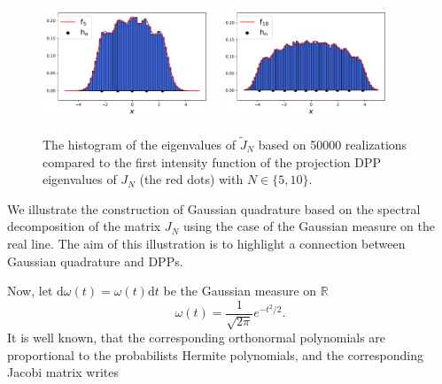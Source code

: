 \documentclass[twoside,11pt]{book}
\numberwithin{theorem}{chapter}
\numberwithin{definition}{chapter}
\numberwithin{proposition}{chapter}
\numberwithin{corollary}{chapter}
\numberwithin{example}{chapter}
\numberwithin{lemma}{chapter}
\numberwithin{assumption}{chapter}
\begin{document}
\begin{figure}[]
    \centering
\includegraphics[width= 0.45\textwidth]{img/neurips/Hermite/HermiteOP_kernel_diagonal_N_5_vs_50000_empirical}~
\includegraphics[width= 0.45\textwidth]{img/neurips/Hermite/HermiteOP_kernel_diagonal_N_10_vs_50000_empirical}
\caption{The histogram of the eigenvalues of $\tilde{J}_{N}$ based on 50000 realizations compared to the first intensity function of the projection DPP eigenvalues of $J_{N}$ (the red dots)  with $N \in\{5,10\}$.   \label{fig:unidimHermiteEnsembleChristoffel}}
\end{figure}

We illustrate the construction of Gaussian quadrature based on the spectral decomposition of the matrix $J_N$ using the case of the Gaussian measure on the real line. The aim of this illustration is to highlight a connection between Gaussian quadrature and DPPs.

Now, let $\mathrm{d}\omega(t) = \omega(t) \mathrm{d}t$ be the Gaussian measure on $\mathbb{R}$ 
\begin{equation}
\omega(t) = \frac{1}{\sqrt{2\pi}} e^{-t^{2}/2}.
\end{equation}
It is well known, that the corresponding orthonormal polynomials are proportional to the probabilists Hermite polynomials, and the corresponding Jacobi matrix writes
\end{document}
